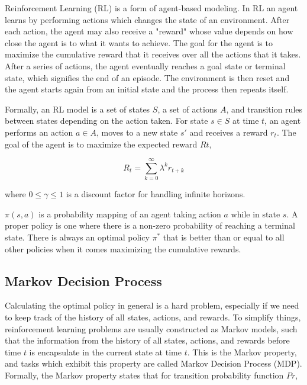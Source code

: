 \documentclass[11pt, oneside]{article}   	%
\begin{document}
Reinforcement Learning (RL) is a form of agent-based modeling. In RL an agent learns by performing actions which changes the state of an environment. After each action, the agent may also receive a "reward" whose value depends on how close the agent is to what it wants to achieve. The goal for the agent is to maximize the cumulative reward that it receives over all the actions that it takes. After a series of actions, the agent eventually reaches a goal state or terminal state, which signifies the end of an episode. The environment is then reset and the agent starts again from an initial state and the process then repeats itself.

\hfill

Formally, an RL model is a set of states $S$, a set of actions $A$, and transition rules between states depending on the action taken. For state $s \in S$ at time $t$, an agent performs an action $a \in A$, moves to a new state $s'$ and receives a reward $r_t$. The goal of the agent is to maximize the expected reward $Rt$,

\begin{equation}
R_t = \sum_{k=0}^{\infty}\lambda^kr_{t+k}
\end{equation}

where $0 \leq \gamma \leq 1$ is a discount factor for handling infinite horizons.

\hfill

$\pi(s,a)$ is a probability mapping of an agent taking action $a$ while in state $s$. A proper policy is one where there is a non-zero probability of reaching a terminal state. There is always an optimal policy $\pi^*$ that is better than or equal to all other policies when it comes maximizing the cumulative rewards. 

\subsection{Markov Decision Process}

Calculating the optimal policy in general is a hard problem, especially if we need to keep track of the history of all states, actions, and rewards. To simplify things, reinforcement learning problems are usually constructed as Markov models, such that the information from the history of all states, actions, and rewards before time $t$ is encapsulate in the current state at time $t$. This is the Markov property, and tasks which exhibit this property are called Markov Decision Process (MDP). Formally, the Markov property states that for transition probability function $Pr$,
\end{document}
